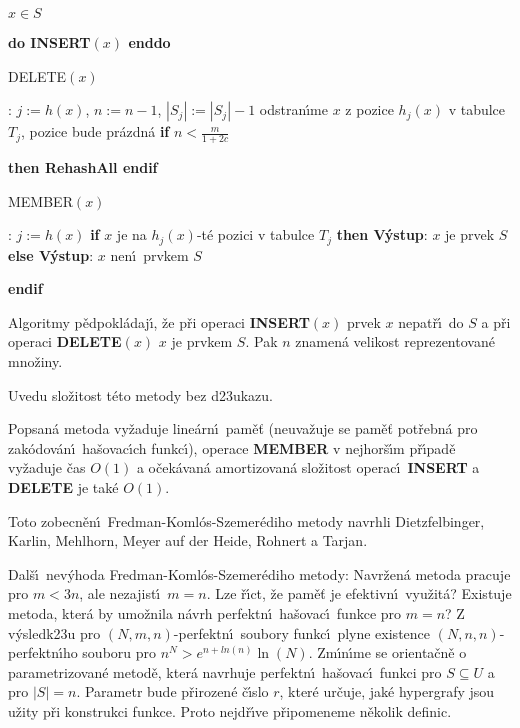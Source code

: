 \phantom{---}{\bf enddo\newline 
enddo\newline 
for every} $x\in S$ {\bf do INSERT$(x)$ enddo
\bigskip

\flushpar DELETE$(x)$}:\newline 
$j:=h(x)$, $n:=n-1$, $|S_j|:=|S_j|-1$\newline 
odstran\'\i me $x$ z pozice $h_j(x)$ v tabulce $T_j$, pozice bude pr\'azdn\'a \newline 
{\bf if} $n<\frac m{1+2c}$ {\bf then RehashAll endif
\bigskip

\flushpar MEMBER$(x)$}: \newline 
$j:=h(x)$\newline 
{\bf if} $x$ je na $h_j(x)$-t\'e pozici v tabulce $T_j$ {\bf then\newline 
\phantom{{\rm ---}}V\'ystup}: $x$ je prvek $S$ \newline 
{\bf else\newline 
\phantom{{\rm ---}}V\'ystup}: $x$ nen\'\i\ prvkem $S$\newline 
{\bf endif
\bigskip

}\flushpar Algoritmy p\v edpokl\'adaj\'\i , \v ze p\v ri operaci {\bf INSERT$
(x)$  }
prvek $x$ nepat\v r\'\i\ do $S$ a p\v ri operaci {\bf DELETE$(x)$} $
x$ je prvkem $S$. 
Pak $n$ znamen\'a velikost reprezentovan\'e mno\v ziny. 
\medskip

\flushpar Uvedu slo\v zitost t\'eto metody bez d\accent23ukazu.
\medskip

Popsan\'a metoda vy\v zaduje line\'arn\'\i\ pam\v e\v t 
(neuva\v zuje se pam\v e\v t pot\v rebn\'a pro zak\'odo\-v\'a\-n\'\i\ ha\v sovac\'\i ch funkc\'\i ), operace {\bf MEMBER }
v nej\-hor\v s\'\i m p\v r\'\i pad\v e vy\v zaduje \v cas $O(1)$ a o\v cek\'avan\'a 
amortizovan\'a slo\v zitost operac\'\i\ {\bf INSERT} a {\bf DELETE} je tak\'e $
O(1)$.
\endproclaim

\flushpar Toto zobecn\v en\'\i\ Fredman-Koml\'os-Szemer\'ediho metody navrhli 
Dietzfelbinger, Karlin, Mehl\-horn, Meyer auf der Heide, Rohnert 
a Tarjan.
\bigskip

\flushpar Dal\v s\'\i\ nev\'yhoda Fredman-Koml\'os-Szemer\'ediho metody:\newline 
Navr\v zen\'a metoda pracuje pro $m<3n$, ale nezajist\'\i\ $m=n$. 
Lze \v r\'\i ct, \v ze pam\v e\v t je efektivn\'\i\ vyu\v zit\'a? Existuje 
metoda, kter\'a by umo\v znila n\'avrh perfektn\'\i\ ha\v sovac\'\i\ 
funkce pro $m=n$? Z v\'ysledk\accent23u pro 
$(N,m,n)$-perfektn\'\i\ soubory funkc\'\i\ plyne existence 
$(N,n,n)$-perfektn\'\i ho souboru pro $n^N>e^{n+ln(n)}\ln(N)$. 
Zm\'\i n\'\i me se orienta\v cn\v e o parametrizovan\'e metod\v e, kter\'a 
navr\-huje perfektn\'\i\ ha\v sovac\'\i\ funkci pro $S\subseteq U$ a pro 
$|S|=n$. Parametr bude p\v rirozen\'e \v c\'\i slo $r$, kter\'e ur\v cuje, 
jak\'e hypergrafy jsou u\v zity p\v ri konstrukci funkce. Proto 
nejd\v r\'\i ve p\v ripomeneme n\v ekolik definic.

